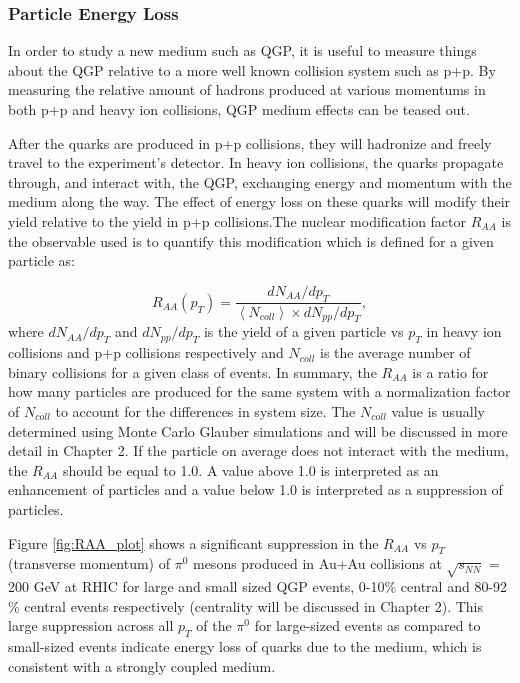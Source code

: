 \subsubsection{Particle Energy Loss}
In order to study a new medium such as QGP, it is useful to measure things about the QGP relative to a more well known collision system such as p+p. By measuring the relative amount of hadrons produced at various momentums in both p+p and heavy ion collisions, QGP medium effects can be teased out.

After the quarks are produced in p+p collisions, they will hadronize and freely travel to the experiment's detector. In heavy ion collisions, the quarks propagate through, and interact
with, the QGP, exchanging energy and momentum with the medium along the way. The effect of energy loss on these quarks will modify their yield relative to the yield in p+p collisions.The nuclear modification factor $R_{AA}$ is the observable used is to quantify this modification which is defined for a given particle as:

\begin{equation}\label{eqn:raa}
 R_{AA}(p_T) = \frac{dN_{AA}/dp_T}{\left<N_{coll}\right>\times dN_{pp}/dp_T},
\end{equation}
where $dN_{AA}/dp_T$ and $dN_{pp}/dp_T$ is the yield of a given particle vs $p_T$ in heavy ion collisions and p+p collisions respectively and $N_{coll}$ is the average
number of binary collisions for a given class of events. In summary, the $R_{AA}$ is a ratio for how many particles are produced for the same system with a normalization factor of $N_{coll}$ to account for the differences in system size. The $N_{coll}$ value is usually determined using Monte Carlo Glauber simulations and will be discussed in more detail in Chapter 2. If the particle on average does not interact with the medium, the $R_{AA}$ should be equal to 1.0. A value above 1.0 is interpreted as an enhancement of particles and a value below 1.0 is interpreted as a suppression of particles. 

Figure \ref{fig:RAA_plot} shows a significant suppression in the $R_{AA}$ vs $p_T$ (transverse momentum) of $\pi^0$ mesons produced in Au+Au collisions at $\sqrt{s_{NN}}$ = 200 GeV at RHIC for large and small sized QGP events, 0-10$\%$ central and 80-92$\%$ central events respectively (centrality will be discussed in Chapter 2). This large suppression across all  $p_T$ of the $\pi^0$ for large-sized events as compared to small-sized events indicate energy loss of quarks due to the medium, which is consistent with a strongly coupled  medium.

